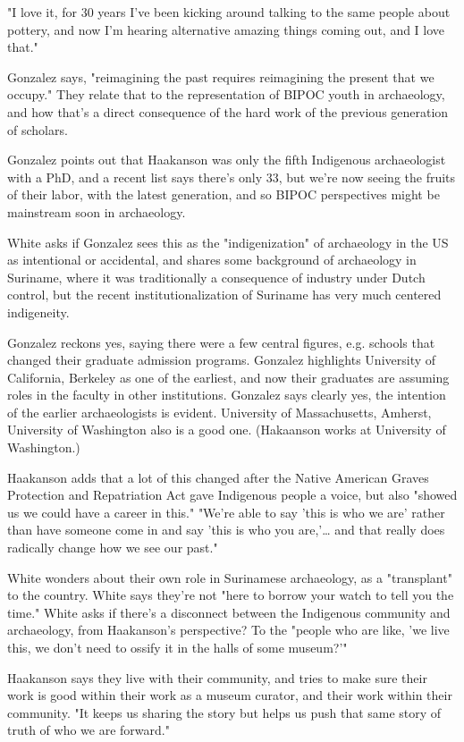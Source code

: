 \documentclass[11pt]{article}
\begin{document}
"I love it, for 30 years I've been kicking around talking to the same people about pottery, and now I'm hearing alternative amazing things coming out, and I love that."

Gonzalez says, "reimagining the past requires reimagining the present that we occupy." They relate that to the representation of BIPOC youth in archaeology, and how that's a direct consequence of the hard work of the previous generation of scholars.

Gonzalez points out that Haakanson was only the fifth Indigenous archaeologist with a PhD, and a recent list says there's only 33, but we're now seeing the fruits of their labor, with the latest generation, and so BIPOC perspectives might be mainstream soon in archaeology.

White asks if Gonzalez sees this as the "indigenization" of archaeology in the US as intentional or accidental, and shares some background of archaeology in Suriname, where it was traditionally a consequence of industry under Dutch control, but the recent institutionalization of Suriname has very much centered indigeneity.

Gonzalez reckons yes, saying there were a few central figures, e.g. schools that changed their graduate admission programs. Gonzalez highlights University of California, Berkeley as one of the earliest, and now their graduates are assuming roles in the faculty in other institutions. Gonzalez says clearly yes, the intention of the earlier archaeologists is evident. University of Massachusetts, Amherst, University of Washington also is a good one. (Hakaanson works at University of Washington.)

Haakanson adds that a lot of this changed after the Native American Graves Protection and Repatriation Act gave Indigenous people a voice, but also "showed us we could have a career in this." "We're able to say 'this is who we are' rather than have someone come in and say 'this is who you are,'… and that really does radically change how we see our past."

White wonders about their own role in Surinamese archaeology, as a "transplant" to the country. White says they're not "here to borrow your watch to tell you the time." White asks if there's a disconnect between the Indigenous community and archaeology, from Haakanson's perspective? To the "people who are like, 'we live this, we don't need to ossify it in the halls of some museum?'"

Haakanson says they live with their community, and tries to make sure their work is good within their work as a museum curator, and their work within their community. "It keeps us sharing the story but helps us push that same story of truth of who we are forward."
\end{document}
